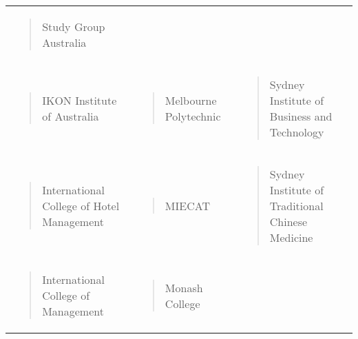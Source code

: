 \documentclass[]{book}
\begin{document}
\begin{longtable}[]{@{}lll@{}}
\begin{minipage}[t]{0.32\columnwidth}
\begin{quote}
Study Group Australia
\end{quote}\strut
\end{minipage}\tabularnewline
\begin{minipage}[t]{0.32\columnwidth}\raggedright
\begin{quote}
IKON Institute of Australia
\end{quote}\strut
\end{minipage} & \begin{minipage}[t]{0.32\columnwidth}\raggedright
\begin{quote}
Melbourne Polytechnic
\end{quote}\strut
\end{minipage} & \begin{minipage}[t]{0.32\columnwidth}\raggedright
\begin{quote}
Sydney Institute of Business and Technology
\end{quote}\strut
\end{minipage}\tabularnewline
\begin{minipage}[t]{0.32\columnwidth}\raggedright
\begin{quote}
International College of Hotel Management
\end{quote}\strut
\end{minipage} & \begin{minipage}[t]{0.32\columnwidth}\raggedright
\begin{quote}
MIECAT
\end{quote}\strut
\end{minipage} & \begin{minipage}[t]{0.32\columnwidth}\raggedright
\begin{quote}
Sydney Institute of Traditional Chinese Medicine
\end{quote}\strut
\end{minipage}\tabularnewline
\begin{minipage}[t]{0.32\columnwidth}\raggedright
\begin{quote}
International College of Management
\end{quote}\strut
\end{minipage} & \begin{minipage}[t]{0.32\columnwidth}\raggedright
\begin{quote}
Monash College
\end{quote}\strut
\end{minipage} & \begin{minipage}[t]{0.32\columnwidth}\raggedright
\begin{quote}

\end{quote}
\end{minipage}
\end{longtable}
\end{document}
